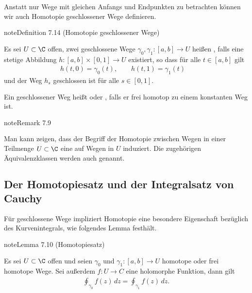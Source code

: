 \documentclass[letterpaper,10pt,german]{jupyterBook}
\begin{document}
\sphinxAtStartPar
Anstatt nur Wege mit gleichen Anfangs und Endpunkten zu betrachten können wir auch Homotopie geschlossener Wege definieren.
\label{complexanalysis/cauchyintegral:definition-4}
\begin{sphinxadmonition}{note}{Definition 7.14 (Homotopie geschlossener Wege)}



\sphinxAtStartPar
Es sei \(U\subset\C\) offen, zwei geschlossene Wege \(\gamma_0, \gamma_1:[a,b]\to U\) heißen , falls eine stetige Abbildung \(h:[a,b]\times[0,1]\to U\) existiert, so dass für alle \(t\in[a,b]\) gilt
\begin{equation*}
\begin{split}h(t,0) = \gamma_0(t), \qquad h(t,1) = \gamma_1(t)\quad\end{split}
\end{equation*}
\sphinxAtStartPar
und der Weg \(h_s\) geschlossen ist für alle \(s\in [0,1]\).

\sphinxAtStartPar
Ein geschlossener Weg heißt  oder , falls er frei homotop zu einem konstanten Weg ist.
\end{sphinxadmonition}
\label{complexanalysis/cauchyintegral:remark-5}
\begin{sphinxadmonition}{note}{Remark 7.9}



\sphinxAtStartPar
Man kann zeigen, dass der Begriff der Homotopie zwischen Wegen in einer Teilmenge \(U \subset \C\) eine  auf Wegen in \(U\) induziert. Die zugehörigen Äquivalenzklassen werden auch  genannt.
\end{sphinxadmonition}


\subsection{Der Homotopiesatz und der Integralsatz von Cauchy}
\label{\detokenize{complexanalysis/cauchyintegral:der-homotopiesatz-und-der-integralsatz-von-cauchy}}
\sphinxAtStartPar
Für geschlossene Wege impliziert Homotopie eine besondere Eigenschaft bezüglich des Kurvenintegrals, wie folgendes Lemma festhält.
\label{complexanalysis/cauchyintegral:lem:homotop}
\begin{sphinxadmonition}{note}{Lemma 7.10 (Homotopiesatz)}



\sphinxAtStartPar
Es sei \(U \subset \C\) offen und seien \(\gamma_0\) und \(\gamma_1:[a,b]\to U\) homotope oder frei homotope Wege.
Sei außerdem \(f:U\to C\) eine holomorphe Funktion, dann gilt
\begin{equation*}
\begin{split}\oint_{\gamma_0} f(z) \, dz = \oint_{\gamma_1} f(z) \, dz.\end{split}
\end{equation*}\end{sphinxadmonition}
\end{document}
